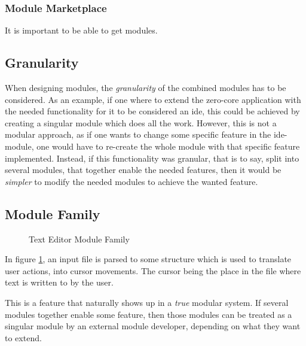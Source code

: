 \subsubsection{Module Marketplace}

It is important to be able to get modules.


\subsection{Granularity}

When designing modules, the \textit{granularity} of the combined modules has to
be considered. As an example, if one where to extend the zero-core application
with the needed functionality for it to be considered an \gls{ide}, this could be
achieved by creating a singular module which does all the work. However, this
is not a modular approach, as if one wants to change some specific feature in
the \gls{ide}-module, one would have to re-create the whole module with that
specific feature implemented. Instead, if this functionality was granular,
that is to say, split into several modules, that together enable the needed
features, then it would be \textit{simpler} to modify the needed modules to
achieve the wanted feature.


\subsection{Module Family}


\begin{figure}
  \centering
  
  \caption{Text Editor Module Family}
  \label{fig:textEditorSimple}
\end{figure}

In figure \ref{fig:textEditorSimple}, an input file is parsed to some structure
which is used to translate user actions, into cursor movements. The cursor being
the place in the file where text is written to by the user.

This is a feature that naturally shows up in a \textit{true} modular system. If
several modules together enable some feature, then those modules can be treated
as a singular module by an external module developer, depending on what they
want to extend.


